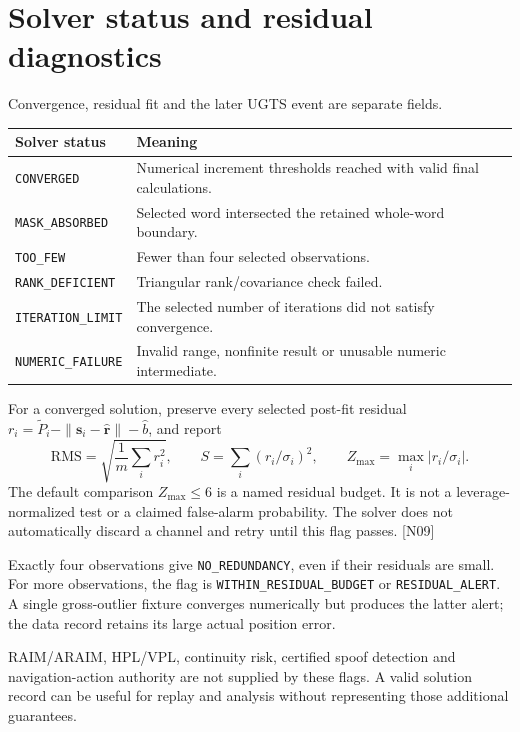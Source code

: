 \documentclass[11pt,a4paper]{article}
\newcommand{\code}[1]{\texttt{#1}}
\newcommand{\dec}[1]{\textcolor{accent}{[N#1]}}
\begin{document}
\section{Solver status and residual diagnostics}
Convergence, residual fit and the later UGTS event are separate fields.
\par\small
\begin{tabularx}{\textwidth}{@{}P{.35\textwidth}Y@{}}\toprule
\textbf{Solver status} & \textbf{Meaning}\\\midrule
\code{CONVERGED} & Numerical increment thresholds reached with valid final calculations.\\
\code{MASK\_ABSORBED} & Selected word intersected the retained whole-word boundary.\\
\code{TOO\_FEW} & Fewer than four selected observations.\\
\code{RANK\_DEFICIENT} & Triangular rank/covariance check failed.\\
\code{ITERATION\_LIMIT} & The selected number of iterations did not satisfy convergence.\\
\code{NUMERIC\_FAILURE} & Invalid range, nonfinite result or unusable numeric intermediate.\\\bottomrule
\end{tabularx}
\par\normalsize

For a converged solution, preserve every selected post-fit residual
$r_i=\widetilde P_i-\|\boldsymbol s_i-\widehat{\boldsymbol r}\|-\widehat b$,
and report
\begin{equation}
\mathrm{RMS}=\sqrt{\frac1m\sum_i r_i^2},\qquad
S=\sum_i(r_i/\sigma_i)^2,\qquad
Z_{\max}=\max_i|r_i/\sigma_i|.
\end{equation}
The default comparison $Z_{\max}\le6$ is a named residual budget. It is not a
leverage-normalized test or a claimed false-alarm probability. The solver does not
automatically discard a channel and retry until this flag passes. \dec{09}

Exactly four observations give \code{NO\_REDUNDANCY}, even if their residuals are
small. For more observations, the flag is \code{WITHIN\_RESIDUAL\_BUDGET} or
\code{RESIDUAL\_ALERT}. A single gross-outlier fixture converges numerically but
produces the latter alert; the data record retains its large actual position error.

RAIM/ARAIM, HPL/VPL, continuity risk, certified spoof detection and navigation-action
authority are not supplied by these flags. A valid solution record can be useful for
replay and analysis without representing those additional guarantees.
\clearpage
\end{document}
